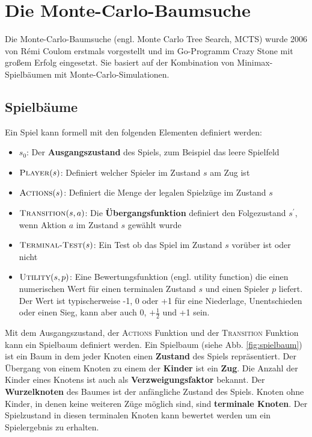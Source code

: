 \section{Die Monte-Carlo-Baumsuche}
\label{chap:mcts}

Die Monte-Carlo-Baumsuche (engl. Monte Carlo Tree Search, MCTS) wurde 2006 von R\'{e}mi Coulom erstmals vorgestellt und im Go-Programm Crazy Stone mit großem Erfolg eingesetzt\autocite{coulomEfficientSelectivityBackup2007}. Sie basiert auf der Kombination von Minimax-Spielbäumen mit Monte-Carlo-Simulationen.


\subsection{Spielbäume}
Ein Spiel kann formell mit den folgenden Elementen definiert werden\autocite[\ppno~162]{russellArtificialIntelligenceModern2009}:
\begin{itemize}
	\item $s_0$: Der \textbf{Ausgangszustand} des Spiels, zum Beispiel das leere Spielfeld
	\item $\textsc{Player}(s)$: Definiert welcher Spieler im Zustand $s$ am Zug ist
	\item $\textsc{Actions}(s)$: Definiert die Menge der legalen Spielzüge im Zustand $s$
	\item $\textsc{Transition}(s,a)$: Die \textbf{Übergangsfunktion} definiert den Folgezustand $s^\prime$, wenn Aktion $a$ im Zustand $s$ gewählt wurde
	\item $\textsc{Terminal-Test}(s)$: Ein Test ob das Spiel im Zustand $s$ vorüber ist oder nicht
	\item $\textsc{Utility}(s,p)$: Eine Bewertungsfunktion (engl. utility function) die einen numerischen Wert für einen terminalen Zustand $s$ und einen Spieler $p$ liefert. Der Wert ist typischerweise -1, 0 oder +1 für eine Niederlage, Unentschieden oder einen Sieg, kann aber auch 0, $+\frac{1}{2}$ und +1 sein.
\end{itemize}

Mit dem Ausgangszustand, der \textsc{Actions} Funktion und der \textsc{Transition} Funktion kann ein Spielbaum definiert werden. Ein Spielbaum (siehe Abb. \ref{fig:spielbaum}) ist ein Baum in dem jeder Knoten einen \textbf{Zustand} des Spiels repräsentiert. Der Übergang von einem Knoten zu einem der \textbf{Kinder} ist ein \textbf{Zug}. Die Anzahl der Kinder eines Knotens ist auch als \textbf{Verzweigungsfaktor} bekannt. Der \textbf{Wurzelknoten} des Baumes ist der anfängliche Zustand des Spiels. Knoten ohne Kinder, in denen keine weiteren Züge möglich sind, sind \textbf{terminale Knoten}. Der Spielzustand in diesen terminalen Knoten kann bewertet werden um ein Spielergebnis zu erhalten.

